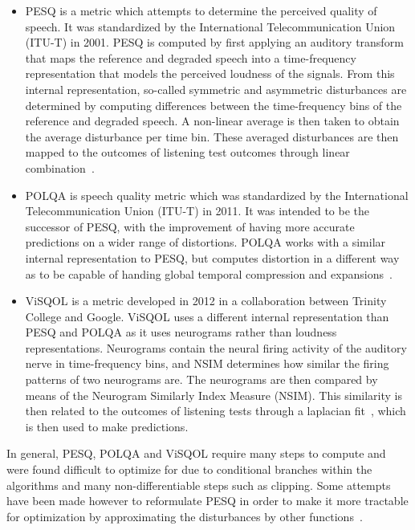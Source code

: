 \begin{itemize}
    \item 
    PESQ is a metric which attempts to determine the perceived quality of speech.
    It was standardized by the International Telecommunication Union (ITU-T) in 2001.
    PESQ is computed by first applying an auditory transform that maps the reference and degraded speech into a 
    time-frequency representation that models the perceived loudness of the signals.
    From this internal representation, so-called symmetric and asymmetric disturbances are determined 
    by computing differences between the time-frequency bins of the reference and degraded speech. 
    A non-linear average is then taken to obtain the average disturbance per time bin.
    These averaged disturbances are then mapped to the outcomes of listening test outcomes through linear 
    combination~\cite{rix2001perceptual}.
    \item
    POLQA is speech quality metric which was standardized by the International Telecommunication Union (ITU-T) in 2011. 
    It was intended to be the successor of PESQ, with the improvement of having more accurate predictions on a 
    wider range of distortions.
    POLQA works with a similar internal representation to PESQ, but computes distortion in a different way 
    as to be capable of handing global temporal compression and expansions~\cite{beerends2013perceptual}.
    \item
    ViSQOL is a metric developed in 2012 in a collaboration between Trinity College and Google.
    ViSQOL uses a different internal representation than PESQ and POLQA as it uses neurograms rather than loudness representations. 
    Neurograms contain the neural firing activity of the auditory nerve in time-frequency bins, and NSIM determines how similar
    the firing patterns of two neurograms are.
    The neurograms are then compared by means of the Neurogram Similarly Index Measure (NSIM).
    This similarity is then related to the outcomes of listening tests through a laplacian fit~\cite{hines2012visqol}, which is then used to make predictions.
\end{itemize}
In general, PESQ, POLQA and ViSQOL require many steps to compute and were found difficult to optimize for due to 
conditional branches within the algorithms and many non-differentiable steps such as clipping. 
Some attempts have been made however to reformulate PESQ in order to make it more tractable for optimization 
by approximating the disturbances by other functions~\cite{kim2019end}.

